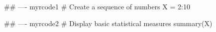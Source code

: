 


\raggedbottom													










\textcolor{black}{\tableofcontents}											

\immediate{}




 
## ---- myrcode1
# Create a sequence of numbers
 X = 2:10

## ---- myrcode2
# Display basic statistical measures
summary(X)














\clearpage

\begingroup
    \raggedright
\endgroup




